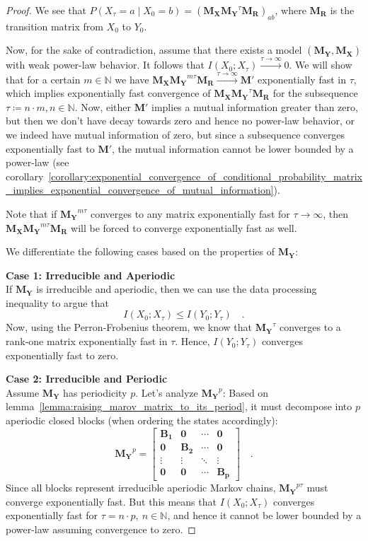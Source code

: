 \documentclass[../../main.tex]{subfiles}
\begin{document}
\begin{proof}
        We see that $P(X_{\tau} = a \mid X_0 = b) = (\bm{M_X} \bm{M_Y}^\tau \bm{M_R})_{ab}$, where $\bm{M_R}$ is the transition matrix from $X_0$ to $Y_0$.

        Now, for the sake of contradiction, assume that there exists a model $(\bm{M_Y}, \bm{M_X})$ with weak power-law behavior. It follows that $I(X_0; X_{\tau}) \xrightarrow{\tau \to \infty} 0$. We will show that for a certain $m \in \mathbb{N}$ we have $\bm{M_X} \bm{M_Y}^{m \tau} \bm{M_R} \xrightarrow{\tau \to \infty} \bm{M'}$ exponentially fast in $\tau$, which implies exponentially fast convergence of $\bm{M_X} \bm{M_Y}^{\tau} \bm{M_R}$ for the subsequence $\tau \coloneqq n \cdot m, n \in \mathbb{N}$. Now, either $\bm{M'}$ implies a mutual information greater than zero, but then we don't have decay towards zero and hence no power-law behavior, or we indeed have mutual information of zero, but since a subsequence converges exponentially fast to $\bm{M'}$, the mutual information cannot be lower bounded by a power-law (see corollary~\ref{corollary:exponential_convergence_of_conditional_probability_matrix_implies_exponential_convergence_of_mutual_information}).
        
        Note that if $\bm{M_Y}^{m \tau}$ converges to any matrix exponentially fast for $\tau \to \infty$, then $\bm{M_X} \bm{M_Y}^{m \tau} \bm{M_R}$ will be forced to converge exponentially fast as well.
        
        We differentiate the following cases based on the properties of $\bm{M_Y}$:

        \textbf{Case 1: Irreducible and Aperiodic} \\
        If $\bm{M_Y}$ is irreducible and aperiodic, then we can use the data processing inequality to argue that
        \[
            I(X_0; X_\tau) \leq I(Y_0; Y_\tau) \quad .
        \]
        Now, using the Perron-Frobenius theorem, we know that $\bm{M_Y}^\tau$ converges to a rank-one matrix exponentially fast in $\tau$. Hence, $I(Y_0; Y_\tau)$ converges exponentially fast to zero.

        \textbf{Case 2: Irreducible and Periodic} \\
        Assume $\bm{M_Y}$ has periodicity $p$. Let's analyze $\bm{M_Y}^p$: Based on lemma~\ref{lemma:raising_marov_matrix_to_its_period}, it must decompose into $p$ aperiodic closed blocks (when ordering the states accordingly):
        \[
            \bm{M_Y}^p = 
            \begin{bmatrix}
            \bm{B_1} & \bm{0} & \cdots & \bm{0} \\
            \bm{0} & \bm{B_2} & \cdots & \bm{0} \\
            \vdots & \vdots & \ddots & \vdots \\
            \bm{0} & \bm{0} & \cdots & \bm{B_p}
            \end{bmatrix}
            \quad .
        \]
        Since all blocks represent irreducible aperiodic Markov chains, $\bm{M_Y}^{p \tau}$ must converge exponentially fast. But this means that $I(X_0; X_\tau)$ converges exponentially fast for $\tau = n \cdot p, \ n \in \mathbb{N}$, and hence it cannot be lower bounded by a power-law assuming convergence to zero.


\end{proof}
\end{document}
